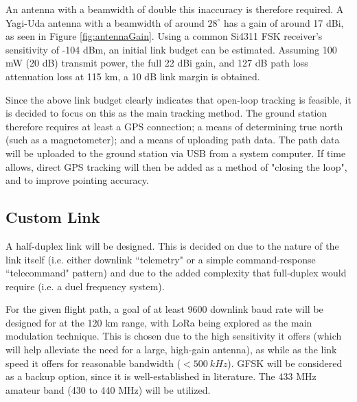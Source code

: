 An antenna with a beamwidth of double this inaccuracy is therefore required. A Yagi-Uda antenna with a beamwidth of around $28^\circ$ has a gain of around 17 dBi, as seen in Figure \ref{fig:antennaGain}. Using a common Si4311 FSK receiver's sensitivity of -104 dBm, an initial link budget can be estimated. Assuming 100 mW (20 dB) transmit power, the full 22 dBi gain, and 127 dB path loss attenuation loss at 115 km, a 10 dB link margin is obtained.

Since the above link budget clearly indicates that open-loop tracking is feasible, it is decided to focus on this as the main tracking method. The ground station therefore requires at least a GPS connection; a means of determining true north (such as a magnetometer); and a means of uploading path data. The path data will be uploaded to the ground station via USB from a system computer. If time allows, direct GPS tracking will then be added as a method of "closing the loop", and to improve pointing accuracy.

\subsection{Custom Link}
A half-duplex link will be designed. This is decided on due to the nature of the link itself (i.e. either downlink ``telemetry" or a simple command-response ``telecommand" pattern) and due to the added complexity that full-duplex would require (i.e. a duel frequency system).

For the given flight path, a goal of at least 9600 downlink baud rate will be designed for at the 120 km range, with LoRa being explored as the main modulation technique. This is chosen due to the high sensitivity it offers (which will help alleviate the need for a large, high-gain antenna), as while as the link speed it offers for reasonable bandwidth ($< \SI{500}{kHz}$). GFSK will be considered as a backup option, since it is well-established in literature. The 433 MHz amateur band (430 to 440 MHz) will be utilized.